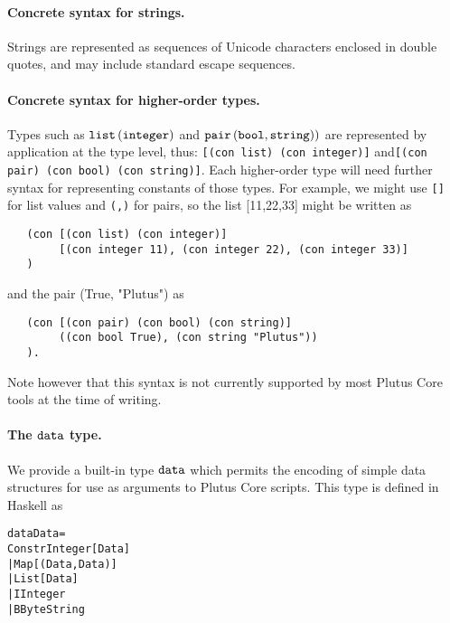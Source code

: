 \paragraph{Concrete syntax for strings.} Strings are represented as sequences of Unicode characters
enclosed in double quotes, and may include standard escape sequences.

\paragraph{Concrete syntax for higher-order types.} Types such as $\mathtt{list}\,\mathtt{(}\mathtt{integer}\mathtt{)}$
and $\mathtt{pair}\,\mathtt{(}\mathtt{bool}\mathtt{,}\,\mathtt{string)}\mathtt{)}$ are represented by application at the
type level, thus: \texttt{[(con list) (con integer)]} and\texttt{[(con pair)
    (con bool) (con string)]}.  Each higher-order type will need further syntax
for representing constants of those types.  For example, we might use
\texttt{[]} for list values and \texttt{(,)} for pairs, so the list [11,22,33]
might be written as
\begin{verbatim}
   (con [(con list) (con integer)] 
        [(con integer 11), (con integer 22), (con integer 33)]
   )
\end{verbatim}
and the pair (True, "Plutus") as
\begin{verbatim}
   (con [(con pair) (con bool) (con string)] 
        ((con bool True), (con string "Plutus"))
   ).
\end{verbatim}
Note however that this syntax is not currently supported by most Plutus Core tools at the time of writing.



\paragraph{The $\mathtt{data}$ type.}
We provide a built-in type $\mathtt{data}$ which permits the encoding of simple data structures
for use as arguments to Plutus Core scripts.  This type is defined in Haskell as 
\begin{alltt}
data Data =
      Constr Integer [Data]
    | Map [(Data, Data)]
    | List [Data]
    | I Integer
    | B ByteString
\end{alltt}



